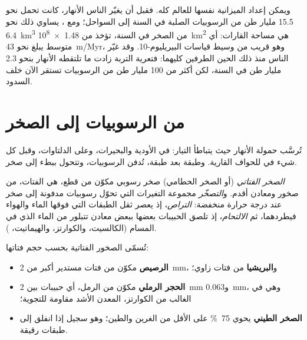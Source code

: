 ويمكن إعداد الميزانية نفسها للعالم كله. فقبل أن يغيّر الناس
الأنهار، كانت تحمل نحو 15.5 مليار طن من الرسوبيات الصلبة في السنة إلى
السواحل؛ ومع ، يساوي ذلك نحو \qty{6.4}{km^3} من الصخر في
السنة، تؤخذ من \qty{1.48e8}{km^2} هي مساحة القارات: أي متوسط 
يبلغ نحو \qty{43}{m/Myr}، وهو قريب من وسيط قياسات
البيريليوم-10. وقد غيّر الناس منذ ذلك الحين الطرفين كليهما: فتعرية التربة
زادت ما تلتقطه الأنهار بنحو 2.3 مليار طن في السنة، لكن أكثر
من 100 مليار طن من الرسوبيات تستقر الآن خلف السدود.

\section{من الرسوبيات إلى الصخر}

تُرسَّب حمولة الأنهار حيث يتباطأ التيار: في الأودية والبحيرات،
وعلى الدلتاوات، وقبل كل شيء في  للحواف
القارية. وطبقة بعد طبقة، تُدفن الرسوبيات،
وتتحول ببطء إلى صخر.

\begin{definition}\label{def:g12:destruction-of-mountains:diagenesis}
\emph{الصخر الفتاتي} (أو الصخر الحطامي) صخر
رسوبي مكوّن من قطع، هي الفتات، من صخور ومعادن أقدم.
و\emph{التصخّر} مجموعة التغيرات التي تحوّل رسوبيات
مدفونة إلى صخر عند درجة حرارة منخفضة: \emph{التراص}، إذ يعصر ثقل
الطبقات التي فوقها الماء والهواء فيطردهما، ثم \emph{الالتحام}، إذ
تلصق الحبيبات بعضها ببعض معادن تتبلور من الماء الذي في المسام (الكالسيت،
والكوارتز، والهيماتيت، ).
\end{definition}

تُسمّى الصخور الفتاتية بحسب حجم فتاتها:
\begin{itemize}
  \item \textbf{الرصيص} مكوّن من فتات مستدير أكبر من
        \qty{2}{mm}، و\textbf{البريشيا} من فتات زاوي؛
  \item \textbf{الحجر الرملي} مكوّن من الرمل، أي حبيبات بين \qty{2}{mm}
        و\qty{0.063}{mm}، وهي في الغالب من الكوارتز، المعدن الأشد
        مقاومة للتجوية؛
  \item \textbf{الصخر الطيني} يحوي \qty{75}{\percent} على الأقل من الغرين والطين؛
        وهو سجيل إذا انفلق إلى طبقات رقيقة.
\end{itemize}

